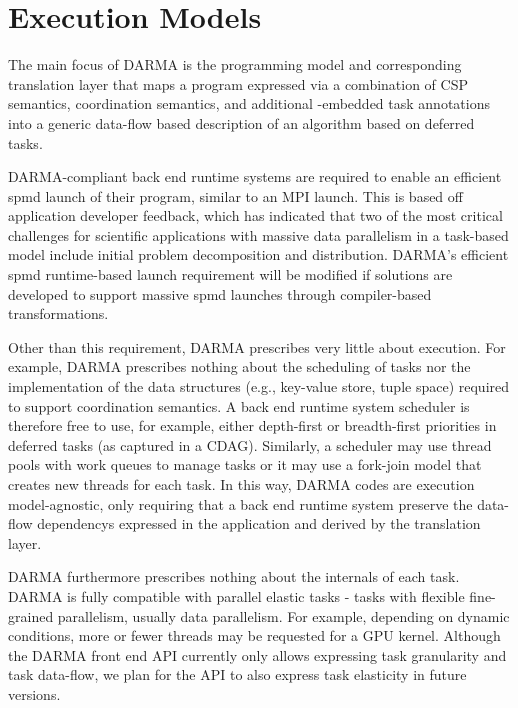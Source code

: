 

\section{Execution Models}
\label{sec:exec_model}

The main focus of \gls{DARMA} is the \gls{programming model} and corresponding
\gls{translation layer} that maps a program expressed via a combination of
\gls{CSP} semantics, \gls{coordination semantics}, and additional \CC{}-embedded task annotations into a generic data-flow based
description of an algorithm based on \glspl{deferred task}.

\gls{DARMA}-compliant \gls{back end} \gls{runtime systems} are required to enable an efficient
\gls{spmd} launch of their program, similar to an MPI launch.
This is based off application developer feedback, which has indicated that 
two of the most critical challenges for scientific applications with massive data parallelism in a task-based model
include initial problem decomposition and distribution.
\gls{DARMA}'s efficient \gls{spmd} runtime-based launch requirement 
will be modified if solutions are developed to support massive \gls{spmd} launches
through compiler-based transformations.

Other than this requirement, \gls{DARMA} prescribes very little about execution.
For example, \gls{DARMA} prescribes nothing about the scheduling of tasks nor the implementation 
of the data structures (e.g., \gls{key-value store}, \gls{tuple space})
  required to support \gls{coordination semantics}.
A \gls{back end} \gls{runtime system} scheduler is therefore free to use, for example,
either depth-first or breadth-first priorities in \glspl{deferred task} (as captured
in a \gls{CDAG}).
Similarly, a scheduler may use \glspl{thread pool} with work queues to manage
\glspl{task} or it may use a \gls{fork-join} model that creates new threads for
each \gls{task}.
In this way, \gls{DARMA} codes are \gls{execution model}-agnostic, only
requiring that a \gls{back end} \gls{runtime system} preserve the
\glspl{data-flow dependency} expressed in the application and derived by the
\gls{translation layer}.

\gls{DARMA} furthermore prescribes nothing about the internals of each task.
\gls{DARMA} is fully compatible with parallel elastic tasks - tasks with
flexible fine-grained parallelism, usually \gls{data parallelism}.
For example, depending on dynamic conditions, more or fewer threads may be requested for a GPU kernel.
Although the \gls{DARMA} \gls{front end} \gls{API} currently only allows expressing task granularity and task data-flow,
we plan for the \gls{API} to also express  task elasticity in future versions.

